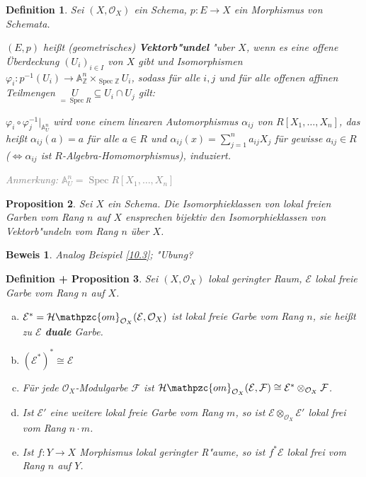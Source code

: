 \documentclass[paper = A4, fontsize=12pt, numbers=noendperiod, chapterprefix=true]{scrbook}
\theoremstyle{break}
\newtheorem{Def}{Definition}[section]
\newtheorem{Prop}[Def]{Proposition}
\newtheorem{DefProp}[Def]{Definition + Proposition}
\theoremstyle{nonumberbreak}
\newtheorem{bew}{Beweis}
\theoremstyle{nonumberplain}
\newcommand{\emp}[1]{\textbf{\emph{#1}}}
\newcommand{\defterm}[1]{{\index{#1}}\emp{#1}}
\newcommand{\deftermspec}[2]{{\index{#2}}\emp{#1}}
\DeclareMathOperator{\Spec}{Spec}
\newcommand{\Z}{\mathbb{Z}}
\newcommand{\A}{\mathbb{A}}
\newcommand{\calE}{\mathcal{E}}
\newcommand{\calF}{\mathcal{F}}
\newcommand{\calO}{\mathcal{O}}
\newcommand{\calHom}{\mathcal{H}\mathpzc{om}}
\newcommand{\X}{\times}
\begin{document}
\begin{Def}
Sei $(X, \calO_X)$ ein Schema, $p: E \to X$ ein Morphismus von Schemata.

$(E, p)$ hei\ss t (geometrisches) \defterm{Vektorb"undel} "uber $X$, wenn es eine offene \"Uberdeckung $(U_i)_{i \in I}$ von $X$ gibt und Isomorphismen $\varphi_i: p^{-1}(U_i) \to \A_\Z^n \X_{\Spec \Z} U_i$, sodass f\"ur alle $i,j$ und f\"ur alle offenen affinen Teilmengen $\underset{= \Spec R}{U} \subseteq U_i \cap U_j$ gilt:

$\varphi_i \circ \varphi_j^{-1}|_{\A_U^n}$ wird vone einem linearen Automorphismus $\alpha_{ij}$ von $R[X_1,\ldots ,X_n]$, das hei\ss t $\alpha_{ij}(a) = a$ f\"ur alle $a \in R$ und $\alpha_{ij}(x) = \sum_{j=1}^n a_{ij} X_j$ f\"ur gewisse $a_{ij} \in R$ ($\Leftrightarrow \alpha_{ij}$ ist $R$-Algebra-Homomorphismus), induziert.

\textcolor{gray}{\emph{Anmerkung}: $\A_U^n = \Spec R[X_1,\ldots ,X_n]$}
\end{Def}

\begin{Prop}
Sei $X$ ein Schema. Die Isomorphieklassen von lokal freien Garben vom Rang $n$ auf $X$ ensprechen bijektiv den Isomorphieklassen von Vektorb"undeln vom Rang $n$ \"uber $X$.
\end{Prop}

\begin{bew}
Analog Beispiel \ref{10.3}; "Ubung?
\end{bew}

\begin{DefProp}\label{10.6}
Sei $(X, \calO_X)$ lokal geringter Raum, $\calE$ lokal freie Garbe vom Rang $n$ auf $X$.
\begin{enumerate}[a)]
\item
	$\calE^* = \calHom_{\calO_X} (\calE, \calO_X)$ ist lokal freie Garbe vom Rang $n$, sie hei\ss t zu $\calE$ \deftermspec{duale}{dual} Garbe.
\item
	$(\calE^*)^* \cong \calE$
\item\label{10.6c}
	F\"ur jede $\calO_X$-Modulgarbe $\calF$ ist $\calHom_{\calO_X}(\calE, \calF) \cong \calE^* \otimes_{\calO_X} \calF$.
\item
	Ist $\calE'$ eine weitere lokal freie Garbe vom Rang $m$, so ist $\calE \otimes_{\calO_X} \calE'$ lokal frei vom Rang $n \cdot m$.
\item
	Ist $f: Y \to X$ Morphismus lokal geringter R"aume, so ist $f^* \calE$ lokal frei vom Rang $n$ auf $Y$.
\end{enumerate}\end{DefProp}
\end{document}
